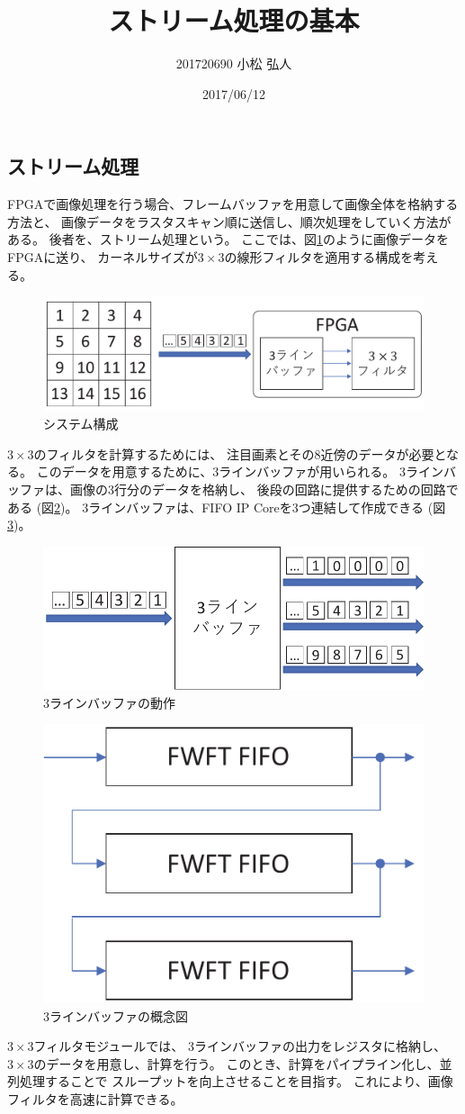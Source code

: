 \documentclass[11pt]{jsarticle}
\title{ストリーム処理の基本}
\author{201720690 小松 弘人}
\date{2017/06/12}
\begin{document}
\maketitle
\subsection*{ストリーム処理}
FPGAで画像処理を行う場合、フレームバッファを用意して画像全体を格納する方法と、
画像データをラスタスキャン順に送信し、順次処理をしていく方法がある。
後者を、ストリーム処理という。
ここでは、図\ref{img:raster}のように画像データをFPGAに送り、
カーネルサイズが$3\!\times\!3$の線形フィルタを適用する構成を考える。

\begin{figure}[ht]
	\centering
	\includegraphics[width=0.7\linewidth]{img/raster.pdf}
	\caption{システム構成}
	\label{img:raster}
\end{figure}

\vspace{-0.5cm}

$3\!\times\!3$のフィルタを計算するためには、
注目画素とその8近傍のデータが必要となる。
このデータを用意するために、3ラインバッファが用いられる。
3ラインバッファは、画像の3行分のデータを格納し、
後段の回路に提供するための回路である (図\ref{img:3linebuf})。
3ラインバッファは、FIFO IP Coreを3つ連結して作成できる (図\ref{img:3lb_fifo})。

\begin{figure}[ht]
	\centering
	\includegraphics[width=0.5\linewidth]{img/3lb.pdf}
	\caption{3ラインバッファの動作}
	\label{img:3linebuf}
\end{figure}

\vspace{-0.5cm}

\begin{figure}[ht]
	\centering
	\includegraphics[width=0.3\linewidth]{img/3lb_fifo.pdf}
	\caption{3ラインバッファの概念図}
	\label{img:3lb_fifo}
\end{figure}

$3\!\times\!3$フィルタモジュールでは、
3ラインバッファの出力をレジスタに格納し、
$3\!\times\!3$のデータを用意し、計算を行う。
このとき、計算をパイプライン化し、並列処理することで
スループットを向上させることを目指す。
これにより、画像フィルタを高速に計算できる。
\end{document}

